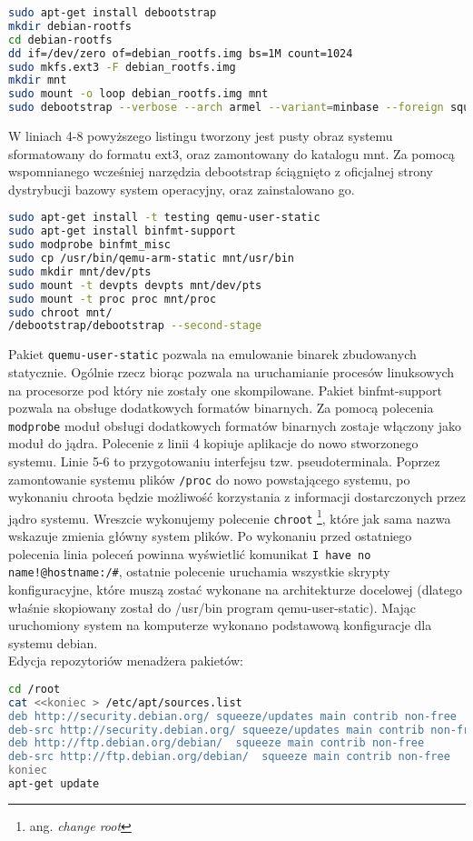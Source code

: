 \begin{lstlisting}[language=bash]
sudo apt-get install debootstrap
mkdir debian-rootfs
cd debian-rootfs
dd if=/dev/zero of=debian_rootfs.img bs=1M count=1024
sudo mkfs.ext3 -F debian_rootfs.img
mkdir mnt
sudo mount -o loop debian_rootfs.img mnt
sudo debootstrap --verbose --arch armel --variant=minbase --foreign squeeze mnt http://ftp.debian.org/debian
\end{lstlisting}

W liniach 4-8 powyższego listingu tworzony jest pusty obraz systemu sformatowany do formatu ext3, oraz zamontowany do katalogu mnt. Za pomocą wspomnianego wcześniej narzędzia debootstrap ściągnięto z oficjalnej strony dystrybucji bazowy system operacyjny, oraz zainstalowano go.


\begin{lstlisting}[language=bash]
sudo apt-get install -t testing qemu-user-static
sudo apt-get install binfmt-support
sudo modprobe binfmt_misc
sudo cp /usr/bin/qemu-arm-static mnt/usr/bin
sudo mkdir mnt/dev/pts
sudo mount -t devpts devpts mnt/dev/pts
sudo mount -t proc proc mnt/proc
sudo chroot mnt/
/debootstrap/debootstrap --second-stage
\end{lstlisting}

Pakiet \lstinline{quemu-user-static} pozwala na emulowanie binarek zbudowanych statycznie. Ogólnie rzecz biorąc pozwala na uruchamianie procesów linuksowych na procesorze pod który nie zostały one skompilowane. Pakiet binfmt-support pozwala na obsługe dodatkowych formatów binarnych. Za pomocą polecenia \lstinline{modprobe} moduł obsługi dodatkowych formatów binarnych zostaje włączony jako moduł do jądra. Polecenie z linii 4 kopiuje aplikacje do nowo stworzonego systemu. Linie 5-6 to przygotowaniu interfejsu tzw. pseudoterminala. Poprzez zamontowanie systemu plików \lstinline{/proc} do nowo powstającego systemu, po wykonaniu chroota będzie możliwość korzystania z informacji dostarczonych przez jądro systemu. Wreszcie wykonujemy polecenie \lstinline{chroot} \footnote{ang. \emph{change root}}, które jak sama nazwa wskazuje zmienia główny system plików. Po wykonaniu przed ostatniego polecenia linia poleceń powinna wyświetlić komunikat \lstinline{I have no name!@hostname:/#}, ostatnie polecenie uruchamia wszystkie skrypty konfiguracyjne, które muszą zostać wykonane na architekturze docelowej (dlatego właśnie skopiowany został do /usr/bin program qemu-user-static). Mając uruchomiony system na komputerze wykonano podstawową konfiguracje dla systemu debian.
\\
Edycja repozytoriów menadżera pakietów:
\begin{lstlisting}[language=bash]
cd /root
cat <<koniec > /etc/apt/sources.list
deb http://security.debian.org/ squeeze/updates main contrib non-free
deb-src http://security.debian.org/ squeeze/updates main contrib non-free
deb http://ftp.debian.org/debian/  squeeze main contrib non-free
deb-src http://ftp.debian.org/debian/  squeeze main contrib non-free
koniec
apt-get update
\end{lstlisting}


